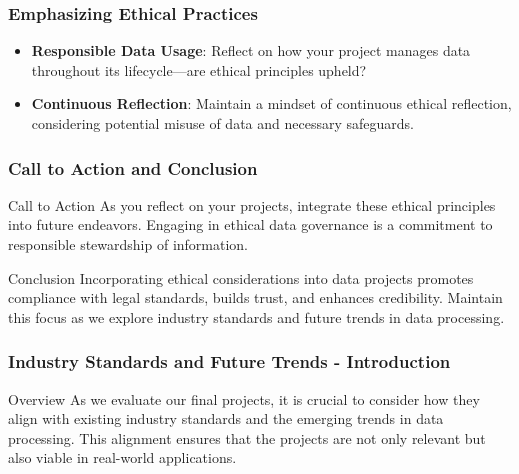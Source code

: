 \documentclass[aspectratio=169]{beamer}
\begin{document}
\begin{frame}[fragile]
    \frametitle{Emphasizing Ethical Practices}
    
    \begin{itemize}
        \item \textbf{Responsible Data Usage}: Reflect on how your project manages data throughout its lifecycle—are ethical principles upheld?
        
        \item \textbf{Continuous Reflection}: Maintain a mindset of continuous ethical reflection, considering potential misuse of data and necessary safeguards.
    \end{itemize}
\end{frame}

\begin{frame}[fragile]
    \frametitle{Call to Action and Conclusion}
    
    \begin{block}{Call to Action}
        As you reflect on your projects, integrate these ethical principles into future endeavors. Engaging in ethical data governance is a commitment to responsible stewardship of information.
    \end{block}
    
    \begin{block}{Conclusion}
        Incorporating ethical considerations into data projects promotes compliance with legal standards, builds trust, and enhances credibility. 
        Maintain this focus as we explore industry standards and future trends in data processing.
    \end{block}
\end{frame}

\begin{frame}[fragile]
    \frametitle{Industry Standards and Future Trends - Introduction}
    \begin{block}{Overview}
        As we evaluate our final projects, it is crucial to consider how they align with existing industry standards and the emerging trends in data processing. This alignment ensures that the projects are not only relevant but also viable in real-world applications.
    \end{block}
\end{frame}
\end{document}
